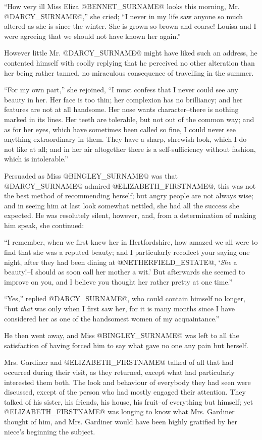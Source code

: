 ``How very ill Miss Eliza @BENNET_SURNAME@ looks this morning, Mr. @DARCY_SURNAME@,'' she
cried; ``I never in my life saw anyone so much altered as she is since
the winter. She is grown so brown and coarse! Louisa and I were agreeing
that we should not have known her again.''

However little Mr. @DARCY_SURNAME@ might have liked such an address, he contented
himself with coolly replying that he perceived no other alteration than
her being rather tanned, no miraculous consequence of travelling in the
summer.

``For my own part,'' she rejoined, ``I must confess that I never could
see any beauty in her. Her face is too thin; her complexion has no
brilliancy; and her features are not at all handsome. Her nose
wants character--there is nothing marked in its lines. Her teeth are
tolerable, but not out of the common way; and as for her eyes,
which have sometimes been called so fine, I could never see anything
extraordinary in them. They have a sharp, shrewish look, which I do
not like at all; and in her air altogether there is a self-sufficiency
without fashion, which is intolerable.''

Persuaded as Miss @BINGLEY_SURNAME@ was that @DARCY_SURNAME@ admired @ELIZABETH_FIRSTNAME@, this was not
the best method of recommending herself; but angry people are not always
wise; and in seeing him at last look somewhat nettled, she had all the
success she expected. He was resolutely silent, however, and, from a
determination of making him speak, she continued:

``I remember, when we first knew her in Hertfordshire, how amazed we all
were to find that she was a reputed beauty; and I particularly recollect
your saying one night, after they had been dining at @NETHERFIELD_ESTATE@, `\textit{She}
a beauty!--I should as soon call her mother a wit.' But afterwards she
seemed to improve on you, and I believe you thought her rather pretty at
one time.''

``Yes,'' replied @DARCY_SURNAME@, who could contain himself no longer, ``but \textit{that}
was only when I first saw her, for it is many months since I have
considered her as one of the handsomest women of my acquaintance.''

He then went away, and Miss @BINGLEY_SURNAME@ was left to all the satisfaction of
having forced him to say what gave no one any pain but herself.

Mrs. Gardiner and @ELIZABETH_FIRSTNAME@ talked of all that had occurred during their
visit, as they returned, except what had particularly interested them
both. The look and behaviour of everybody they had seen were discussed,
except of the person who had mostly engaged their attention. They talked
of his sister, his friends, his house, his fruit--of everything but
himself; yet @ELIZABETH_FIRSTNAME@ was longing to know what Mrs. Gardiner thought of
him, and Mrs. Gardiner would have been highly gratified by her niece's
beginning the subject.



